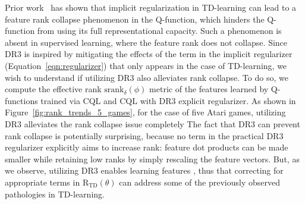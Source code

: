 Prior work~\citep{kumar2021implicit} has shown that implicit regularization in TD-learning can lead to a feature rank collapse phenomenon in the Q-function, which hinders the Q-function from using its full representational capacity. Such a phenomenon is absent in supervised learning, where the feature rank does not collapse. Since DR3 is inspired by mitigating the effects of the term in the implicit regularizer (Equation~\ref{eqn:regularizer}) that only appears in the case of TD-learning, we wish to understand if utilizing DR3 also alleviates rank collapse. To do so, we compute the effective rank $\mathrm{srank}_\delta(\phi)$ metric of the features learned by Q-functions trained via CQL and CQL with DR3 explicit regularizer. As shown in Figure~\ref{fig:rank_trends_5_games}, for the case of five Atari games, utilizing DR3 alleviates the rank collapse issue completely  The fact that DR3 can prevent rank collapse is potentially surprising, because no term in the practical DR3 regularizer explicitly aims to increase rank: feature dot products can be made smaller while retaining low ranks by simply rescaling the feature vectors. But, as we observe, utilizing DR3 enables learning features , thus  that correcting for appropriate terms in $\mathrm{R}_\mathrm{TD}(\theta)$ can address some of the previously observed pathologies in TD-learning. 


